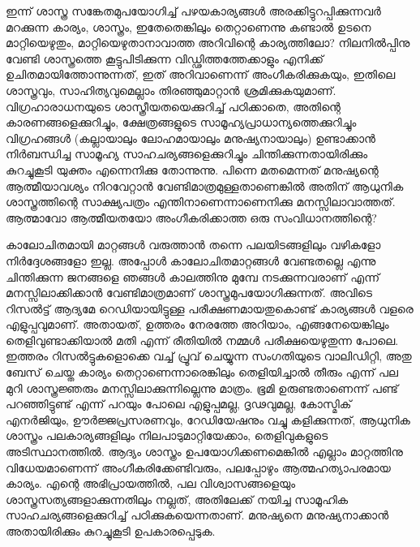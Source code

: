 ഇന്ന് ശാസ്ത്ര സങ്കേതമുപയോഗിച്ച് പഴയകാര്യങ്ങള്‍ അരക്കിട്ടുറപ്പിക്കുന്നവര്‍ മറക്കുന്ന കാര്യം, ശാസ്ത്രം, ഇതേതെങ്കിലും 
തെറ്റാണെന്നു കണ്ടാല്‍ ഉടനെ മാറ്റിയെഴുതും, മാറ്റിയെഴുതാനാവാത്ത അറിവിന്റെ കാര്യത്തിലോ? നിലനില്‍പ്പിനു വേണ്ടി 
ശാസ്ത്രത്തെ കൂട്ടുപിടിക്കുന്ന വിഡ്ഢിത്തത്തേക്കാളും എനിക്ക് ഉചിതമായിത്തോന്നുന്നത്, ഇത് അറിവാണെന്ന് അംഗീകരിക്കുകയും, 
ഇതിലെ ശാസ്ത്രവും, സാഹിത്യവുമെല്ലാം തിരഞ്ഞുമാറ്റാന്‍ ശ്രമിക്കുകയുമാണ്. വിഗ്രഹാരാധനയുടെ ശാസ്ത്രീയതയെക്കുറിച്ച് 
പഠിക്കാതെ, അതിന്റെ കാരണങ്ങളെക്കുറിച്ചും, ക്ഷേത്രങ്ങളുടെ സാമൂഹ്യപ്രാധാന്യത്തെക്കുറിച്ചും വിഗ്രഹങ്ങള്‍ 
(കല്ലായാലും ലോഹമായാലും മനുഷ്യനായാലും) ഉണ്ടാക്കാന്‍ നിര്‍ബന്ധിച്ച സാമൂഹ്യ സാഹചര്യങ്ങളെക്കുറിച്ചും 
ചിന്തിക്കുന്നതായിരിക്കും കുറച്ചുകൂടി യുക്തം എന്നെനിക്കു തോന്നുന്നു. പിന്നെ മതമെന്നത് മനുഷ്യന്റെ ആത്മീയാവശ്യം 
നിറവേറ്റാന്‍ വേണ്ടിമാത്രമുള്ളതാണെങ്കില്‍ അതിന് ആധുനിക ശാസ്ത്രത്തിന്റെ സാക്ഷ്യപത്രം എന്തിനാണെന്നാണെനിക്കു 
മനസ്സിലാവാത്തത്. ആത്മാവോ ആത്മീയതയോ അംഗീകരിക്കാത്ത ഒരു സംവിധാനത്തിന്റെ?

കാലോചിതമായി മാറ്റങ്ങള്‍ വരുത്താന്‍ തന്നെ പലയിടങ്ങളിലും വഴികളോ നിര്‍ദ്ദേശങ്ങളോ ഇല്ല. അപ്പോള്‍ 
കാലോചിതമാറ്റങ്ങള്‍ വേണ്ടതല്ലെ എന്നു ചിന്തിക്കുന്ന ജനങ്ങളെ ഞങ്ങള്‍ കാലത്തിനു മുമ്പേ നടക്കുന്നവരാണ് 
എന്ന് മനസ്സിലാക്കിക്കാന്‍ വേണ്ടിമാത്രമാണ് ശാസ്ത്രമുപയോഗിക്കുന്നത്. അവിടെ റിസല്‍ട്ട് ആദ്യമേ റെഡിയായിട്ടുള്ള 
പരീക്ഷണമായതുകൊണ്ട് കാര്യങ്ങള്‍ വളരെ എളുപ്പവുമാണ്. അതായത്, ഉത്തരം നേരത്തേ അറിയാം, എങ്ങനേയെങ്കിലും 
തെളിവുണ്ടാക്കിയാല്‍ മതി എന്ന് രീതിയില്‍ നമ്മള്‍ പരീക്ഷയെഴുതുന്ന പോലെ. ഇത്തരം റിസല്‍ട്ടുകളൊക്കെ വച്ച് പ്രൂവ് 
ചെയ്യുന്ന സംഗതിയുടെ വാലിഡിറ്റി, അതു ബേസ് ചെയ്ത കാര്യം തെറ്റാണെന്നാരെങ്കിലും തെളിയിച്ചാല്‍ തീരും എന്ന് പല 
മുറി ശാസ്ത്രജ്ഞരും മനസ്സിലാക്കുന്നില്ലെന്നു മാത്രം. ഭൂമി ഉരുണ്ടതാണെന്ന് പണ്ട് പറഞ്ഞിട്ടുണ്ട് എന്ന് പറയും പോലെ 
എളുപ്പമല്ല, ദൃഢവുമല്ല, കോസ്മിക് എനര്‍ജിയും, ഊര്‍ജ്ജപ്രസരണവും, റേഡിയേഷനും വച്ചു കളിക്കുന്നത്, ആധുനിക 
ശാസ്ത്രം പലകാര്യങ്ങളിലും നിലപാടുമാറ്റിയേക്കാം, തെളിവുകളുടെ അടിസ്ഥാനത്തില്‍. ആദ്യം ശാസ്ത്രം ഉപയോഗിക്കണമെങ്കില്‍ 
എല്ലാം മാറ്റത്തിനു വിധേയമാണെന്ന് അംഗീകരിക്കേണ്ടിവരും, പലപ്പോഴും ആത്മഹത്യാപരമായ കാര്യം. എന്റെ 
അഭിപ്രായത്തില്‍, പല വിശ്വാസങ്ങളെയും ശാസ്ത്രസത്യങ്ങളാക്കുന്നതിലും നല്ലത്, അതിലേക്ക് നയിച്ച സാമൂഹിക 
സാഹചര്യങ്ങളെക്കുറിച്ച് പഠിക്കുകയെന്നതാണ്. മനുഷ്യനെ മനുഷ്യനാക്കാന്‍ അതായിരിക്കും കുറച്ചുകൂടി ഉപകാരപ്പെടുക.

